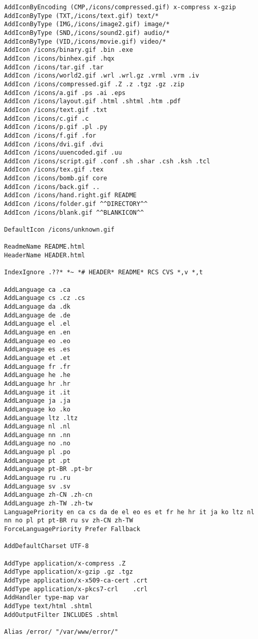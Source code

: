 \begin{code}
\begin{lstlisting}
AddIconByEncoding (CMP,/icons/compressed.gif) x-compress x-gzip
AddIconByType (TXT,/icons/text.gif) text/*
AddIconByType (IMG,/icons/image2.gif) image/*
AddIconByType (SND,/icons/sound2.gif) audio/*
AddIconByType (VID,/icons/movie.gif) video/*
AddIcon /icons/binary.gif .bin .exe
AddIcon /icons/binhex.gif .hqx
AddIcon /icons/tar.gif .tar
AddIcon /icons/world2.gif .wrl .wrl.gz .vrml .vrm .iv
AddIcon /icons/compressed.gif .Z .z .tgz .gz .zip
AddIcon /icons/a.gif .ps .ai .eps
AddIcon /icons/layout.gif .html .shtml .htm .pdf
AddIcon /icons/text.gif .txt
AddIcon /icons/c.gif .c
AddIcon /icons/p.gif .pl .py
AddIcon /icons/f.gif .for
AddIcon /icons/dvi.gif .dvi
AddIcon /icons/uuencoded.gif .uu
AddIcon /icons/script.gif .conf .sh .shar .csh .ksh .tcl
AddIcon /icons/tex.gif .tex
AddIcon /icons/bomb.gif core
AddIcon /icons/back.gif ..
AddIcon /icons/hand.right.gif README
AddIcon /icons/folder.gif ^^DIRECTORY^^
AddIcon /icons/blank.gif ^^BLANKICON^^

DefaultIcon /icons/unknown.gif

ReadmeName README.html
HeaderName HEADER.html

IndexIgnore .??* *~ *# HEADER* README* RCS CVS *,v *,t

AddLanguage ca .ca
AddLanguage cs .cz .cs
AddLanguage da .dk
AddLanguage de .de
AddLanguage el .el
AddLanguage en .en
AddLanguage eo .eo
AddLanguage es .es
AddLanguage et .et
AddLanguage fr .fr
AddLanguage he .he
AddLanguage hr .hr
AddLanguage it .it
AddLanguage ja .ja
AddLanguage ko .ko
AddLanguage ltz .ltz
AddLanguage nl .nl
AddLanguage nn .nn
AddLanguage no .no
AddLanguage pl .po
AddLanguage pt .pt
AddLanguage pt-BR .pt-br
AddLanguage ru .ru
AddLanguage sv .sv
AddLanguage zh-CN .zh-cn
AddLanguage zh-TW .zh-tw
LanguagePriority en ca cs da de el eo es et fr he hr it ja ko ltz nl nn no pl pt pt-BR ru sv zh-CN zh-TW
ForceLanguagePriority Prefer Fallback

AddDefaultCharset UTF-8

AddType application/x-compress .Z
AddType application/x-gzip .gz .tgz
AddType application/x-x509-ca-cert .crt
AddType application/x-pkcs7-crl    .crl
AddHandler type-map var
AddType text/html .shtml
AddOutputFilter INCLUDES .shtml

Alias /error/ "/var/www/error/"


\end{lstlisting}
\end{code}
